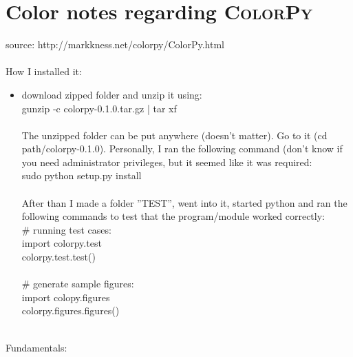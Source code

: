\section{Color notes regarding \textsc{ColorPy}}
source: http://markkness.net/colorpy/ColorPy.html
\\
\\
How I installed it:
\begin{itemize}
   \item download zipped folder and unzip it using:\\
      gunzip -c colorpy-0.1.0.tar.gz | tar xf
      \\
      \\
      The unzipped folder can be put anywhere (doesn't matter). Go to it (cd path/colorpy-0.1.0).
      Personally, I ran the following command (don't know if you need administrator privileges, 
      but it seemed like it was required: \\
      sudo python setup.py install 
      \\
      \\
      After than I made a folder ''TEST'', went into it, started python and ran the following commands to
      test that the program/module worked correctly:\\
      \# running test cases: \\
      import colorpy.test\\
      colorpy.test.test()\\
      \\
      \# generate sample figures: \\
      import colopy.figures\\
      colorpy.figures.figures()\\
      \\
\end{itemize}
Fundamentals:
